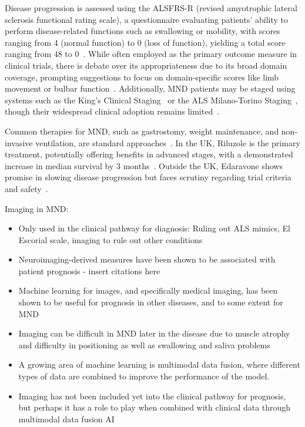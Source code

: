 Disease progression is assessed using the ALSFRS-R (revised amyotrophic lateral sclerosis functional rating scale), a questionnaire evaluating patients' ability to perform disease-related functions such as swallowing or mobility, with scores ranging from 4 (normal function) to 0 (loss of function), yielding a total score ranging from 48 to 0~\cite{cedarbaumALSFRSRRevisedALS1999}.
While often employed as the primary outcome measure in clinical trials, there is debate over its appropriateness due to its broad domain coverage, prompting suggestions to focus on domain-specific scores like limb movement or bulbar function~\cite{vaneijkOldFriendWho2021, rooneyWhatDoesALSFRSR2017}.
Additionally, MND patients may be staged using systems such as the King's Clinical Staging~\cite{rocheProposedStagingSystem2012} or the ALS Milano-Torino Staging~\cite{chioDevelopmentEvaluationClinical2015}, though their widespread clinical adoption remains limited~\cite{feldmanAmyotrophicLateralSclerosis2022, fangComparisonKingMiToS2017}.

Common therapies for MND, such as gastrostomy, weight maintenance, and non-invasive ventilation, are standard approaches~\cite{bourkeEffectsNoninvasiveVentilation2006}.
In the UK, Riluzole is the primary treatment, potentially offering benefits in advanced stages, with a demonstrated increase in median survival by 3 months~\cite{millerRiluzoleAmyotrophicLateral2012, hinchcliffeRiluzoleRealworldEvidence2017}.
Outside the UK, Edaravone shows promise in slowing disease progression but faces scrutiny regarding trial criteria and safety~\cite{witzelSafetyEffectivenessLongterm2022}.

\noindent Imaging in MND:
\begin{itemize}
    \item Only used in the clinical pathway for diagnosis: Ruling out ALS mimics, El Escorial scale, imaging to rule out other conditions
    \item Neuroimaging-derived measures have been shown to be associated with patient prognosis - insert citations here
    \item Machine learning for images, and specifically medical imaging, has been shown to be useful for prognosis in other diseases, and to some extent for MND
    \item Imaging can be difficult in MND later in the disease due to muscle atrophy and difficulty in positioning as well as swallowing and saliva problems
    \item A growing area of machine learning is multimodal data fusion, where different types of data are combined to improve the performance of the model.
    \item Imaging has not been included yet into the clinical pathway for prognosis, but perhaps it has a role to play when combined with clinical data through multimodal data fusion AI
\end{itemize}



